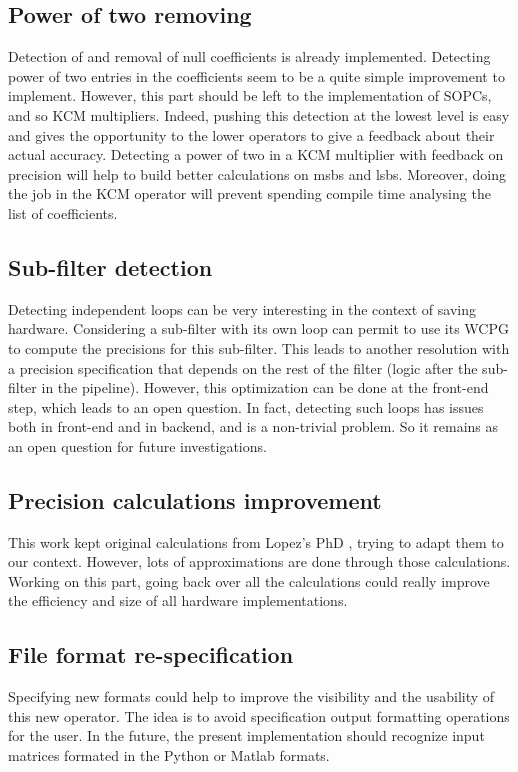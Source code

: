 \subsection{Power of two removing}
	Detection of and removal of null coefficients is already implemented.
	Detecting power of two entries in the coefficients seem to be a quite simple improvement to implement.
	However, this part should be left to the implementation of SOPCs, and so KCM multipliers.
	Indeed, pushing this detection at the lowest level is easy and gives the opportunity to the lower operators to give a feedback about their actual accuracy.
	Detecting a power of two in a KCM multiplier with feedback on precision will help to build better calculations on msbs and lsbs.
	Moreover, doing the job in the KCM operator will prevent spending compile time analysing the list of coefficients.



\subsection{Sub-filter detection}
	Detecting independent loops can be very interesting in the context of saving hardware.
	Considering a sub-filter with its own loop can permit to use its WCPG to compute the precisions for this sub-filter.
	This leads to another resolution with a precision specification that depends on the rest of the filter (logic after the sub-filter in the pipeline).
	However, this optimization can be done at the front-end step, which leads to an open question.
	In fact, detecting such loops has issues both in front-end and in backend, and is a non-trivial problem.
	So it remains as an open question for future investigations.

\subsection{Precision calculations improvement}
	This work kept original calculations from Lopez's PhD \cite{lopez}, trying to adapt them to our context.
	However, lots of approximations are done through those calculations.
	Working on this part, going back over all the calculations could really improve the efficiency and size of all hardware implementations.


\subsection{File format re-specification}
	Specifying new formats could help to improve the visibility and the usability of this new operator.
	The idea is to avoid specification output formatting operations for the user.
	In the future, the present implementation should recognize input matrices formated in the Python or Matlab formats.
